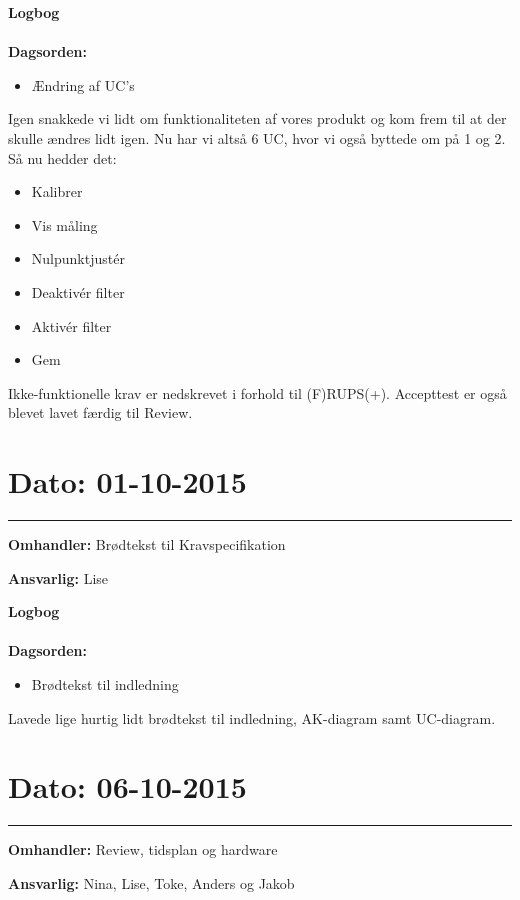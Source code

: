 \textbf{Logbog}
\\
\\
\textbf{Dagsorden:}
\begin{itemize}
\item Ændring af UC's
\end{itemize}
	
Igen snakkede vi lidt om funktionaliteten af vores produkt og kom frem til at der skulle ændres lidt igen. Nu har vi altså 6 UC, hvor vi også byttede om på 1 og 2. Så nu hedder det: 
\begin{itemize}
	\item Kalibrer
	\item Vis måling 
	\item Nulpunktjustér 
	\item Deaktivér filter 
	\item Aktivér filter
	\item Gem 
\end{itemize}

Ikke-funktionelle krav er nedskrevet i forhold til (F)RUPS(+). Accepttest er også blevet lavet færdig til Review. 

	
	

\section{Dato: 01-10-2015 }
\hrule

\textbf{Omhandler:} Brødtekst til Kravspecifikation 

\textbf{Ansvarlig:} Lise 

\textbf{Logbog}
\\
\\
\textbf{Dagsorden:}
\begin{itemize}
	\item Brødtekst til indledning
\end{itemize}

Lavede lige hurtig lidt brødtekst til indledning, AK-diagram samt UC-diagram. 




\section{Dato: 06-10-2015 }
\hrule

\textbf{Omhandler:} Review, tidsplan og hardware  

\textbf{Ansvarlig:} Nina, Lise, Toke, Anders og Jakob

